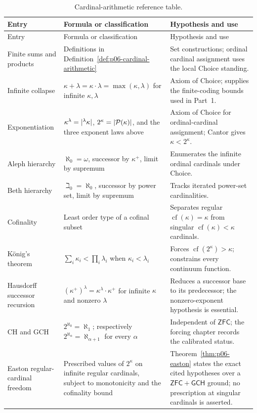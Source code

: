 \begingroup\small
\begin{longtable}{@{}p{}p{}p{}@{}}
\caption{Cardinal-arithmetic reference table.}
\label{tab:p06-cardinal-arithmetic}\\
\toprule
Entry & Formula or classification & Hypothesis and use \\
\midrule
\endfirsthead
\toprule
Entry & Formula or classification & Hypothesis and use \\
\midrule
\endhead
Finite sums and products & Definitions in
Definition~\ref{def:p06-cardinal-arithmetic} & Set constructions; ordinal
cardinal assignment uses the local Choice standing. \\
Infinite collapse & \(\kappa+\lambda=\kappa\cdot\lambda=
\max(\kappa,\lambda)\) for infinite \(\kappa,\lambda\) & Axiom of Choice;
supplies the finite-coding bounds used in Part~1. \\
Exponentiation & \(\kappa^\lambda=\lvert{}^{\lambda}\kappa\rvert\),
\(2^\kappa=\lvert\mathcal P(\kappa)\rvert\), and the three exponent laws above & Axiom
of Choice for ordinal-cardinal assignment; Cantor gives
\(\kappa<2^\kappa\). \\
Aleph hierarchy & \(\aleph_0=\omega\), successor by \(\kappa^+\), limit by
supremum & Enumerates the infinite ordinal cardinals under Choice. \\
Beth hierarchy & \(\beth_0=\aleph_0\), successor by power set, limit by
supremum & Tracks iterated power-set cardinalities. \\
Cofinality & Least order type of a cofinal subset & Separates regular
\(\operatorname{cf}(\kappa)=\kappa\) from singular
\(\operatorname{cf}(\kappa)<\kappa\) cardinals. \\
K\"onig's theorem & \(\sum_i\kappa_i<\prod_i\lambda_i\) when
\(\kappa_i<\lambda_i\) & Forces
\(\operatorname{cf}(2^\kappa)>\kappa\); constrains every continuum function. \\
Hausdorff successor recursion &
\((\kappa^+)^\lambda=\kappa^\lambda\cdot\kappa^+\) for infinite
\(\kappa\) and nonzero \(\lambda\) & Reduces a successor base to its
predecessor; the nonzero-exponent hypothesis is essential. \\
CH and GCH & \(2^{\aleph_0}=\aleph_1\); respectively
\(2^{\aleph_\alpha}=\aleph_{\alpha+1}\) for every \(\alpha\) & Independent
of \(\mathsf{ZFC}\); the forcing chapter records the calibrated status. \\
Easton regular-cardinal freedom & Prescribed values of \(2^\kappa\) on
infinite regular cardinals, subject to monotonicity and the cofinality bound &
Theorem~\ref{thm:p06-easton} states the exact cited hypotheses over a
\(\mathsf{ZFC}+\mathsf{GCH}\) ground; no prescription at singular cardinals is
asserted. \\
\bottomrule
\end{longtable}
\endgroup


